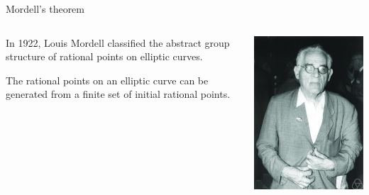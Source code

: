 \documentclass[10pt]{beamer}
\theoremstyle{definition}
\begin{document}
\begin{frame}[t]{Mordell's theorem}

\begin{columns}[T]

\begin{column}{0.8\textwidth}
In 1922, Louis Mordell classified the abstract group structure of rational points on elliptic curves.

\vspace{0.5cm}

\begin{theorem}[Mordell]
The rational points on an elliptic curve can be generated from a finite set of initial rational points.
\end{theorem}
\end{column}

\begin{column}{0.1\textwidth}
\hspace{-1cm}
\includegraphics[width=1.5\textwidth]{mordell.jpg}
\end{column}


\end{columns}
\end{frame}
\end{document}
